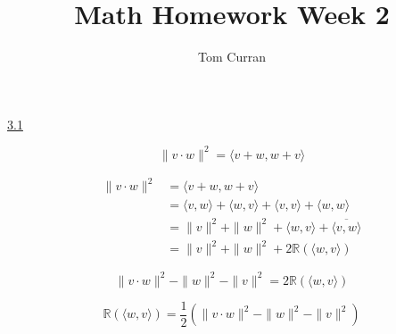 \documentclass{article}
\title{Math Homework Week 2}
\author{Tom Curran}
\begin{document}
\maketitle{}
\section{}

\underline{3.1}

\[ \| v \cdot w \| ^2 = \langle v + w, w+v \rangle \]

\begin{equation} \label{eq1}
  \begin{split}
  \| v \cdot w \|^2 & = \langle v + w, w+v \rangle \\
  & = \langle v,w \rangle + \langle w,v \rangle + \langle v,v \rangle + \langle w,w \rangle \\
  & = \| v \|^2 + \| w \|^2 + \langle w,v \rangle + \overline{\langle v,w \rangle} \\
  & = \| v \|^2 + \| w \|^2 + 2 \mathbb{R}( \langle w,v \rangle )
 \end{split}
\end{equation}

\[\| v \cdot w \|^2 - \|w\|^2 - \|v\|^2 = 2 \mathbb{R}( \langle w,v \rangle ) \]

\[ \mathbb{R}( \langle w,v \rangle ) = \frac{1}{2} (\| v \cdot w \|^2 - \|w\|^2 - \|v\|^2) \]
\end{document}

